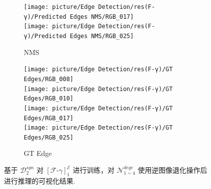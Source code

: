 \documentclass[a4paper]{ctexart}
\begin{document}
\begin{figure}[htbp]
\begin{subfigure}{0.16\textwidth}
			\texttt{[image: picture/Edge Detection/res(F-γ)/Predicted Edges NMS/RGB\_017]} \\
			\texttt{[image: picture/Edge Detection/res(F-γ)/Predicted Edges NMS/RGB\_025]}
			\caption{NMS}
		\end{subfigure}
		\begin{subfigure}{0.16\textwidth}
			\texttt{[image: picture/Edge Detection/res(F-γ)/GT Edges/RGB\_008]} \\
			\texttt{[image: picture/Edge Detection/res(F-γ)/GT Edges/RGB\_010]} \\
			\texttt{[image: picture/Edge Detection/res(F-γ)/GT Edges/RGB\_017]} \\
			\texttt{[image: picture/Edge Detection/res(F-γ)/GT Edges/RGB\_025]}
			\caption{GT Edge}
		\end{subfigure}
		\caption{基于 $\mathcal{D}^{syn}_{2}$ 对 ${\left[\mathcal{F}\text{-}\gamma\right]}^{\mathcal{E}}_1$ 进行训练，对 $\mathcal{N}_{1 \sim 4}^{dege}$ 使用逆图像退化操作后进行推理的可视化结果.}
		
	\end{figure}
	
\end{document}
